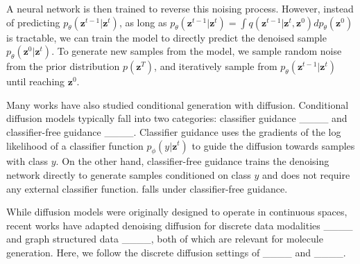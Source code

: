 A neural network is then trained to reverse this noising process. However, instead of predicting $p_{\theta}(\bm{z}^{t-1} | \bm{z}^t)$, as long as $p_{\theta}(\bm{z}^{t-1} | \bm{z}^t) = \int q(\bm{z}^{t-1} | \bm{z}^t, \bm{z}^0)dp_{\theta}(\bm{z}^0)$ is tractable, we can train the model to directly predict the denoised sample $p_{\theta}(\bm{z}^0 | \bm{z}^t)$. To generate new samples from the model, we sample random noise from the prior distribution $p(\bm{z}^T)$, and iteratively sample from $p_{\theta}(\bm{z}^{t-1} | \bm{z}^t)$ until reaching $\bm{z}^0$.

Many works have also studied conditional generation with diffusion. Conditional diffusion models typically fall into two categories: classifier guidance ____ and classifier-free guidance ____. Classifier guidance uses the gradients of the log likelihood of a classifier function $p_{\phi}(y | \bm{z}^t)$ to guide the diffusion towards samples with class $y$. On the other hand, classifier-free guidance trains the denoising network directly to generate samples conditioned on class $y$ and does not require any external classifier function. \ours falls under classifier-free guidance.   

While diffusion models were originally designed to operate in continuous spaces, recent works have adapted denoising diffusion for discrete data modalities ____ and graph structured data ____, both of which are relevant for molecule generation. Here, we follow the discrete diffusion settings of ____ and ____.